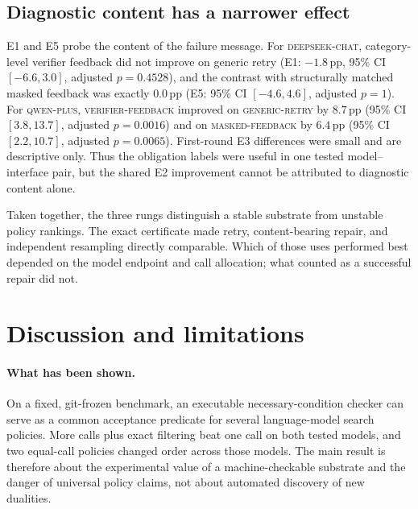 \documentclass[11pt]{scrartcl}
\newcommand{\dscode}{\textsc{deepseek-chat}}
\newcommand{\qwcode}{\textsc{qwen-plus}}
\newcommand{\grarm}{\textsc{generic-retry}}
\newcommand{\vfarm}{\textsc{verifier-feedback}}
\newcommand{\maskedarm}{\textsc{masked-feedback}}
\newcommand{\pp}{\,\mathrm{pp}}
\begin{document}
\subsection{Diagnostic content has a narrower effect}

E1 and E5 probe the content of the failure message.  For \dscode{},
category-level verifier feedback did not improve on generic retry (E1:
$-1.8\pp$, 95\% CI $[-6.6,3.0]$, adjusted $p=0.4528$), and the contrast with
structurally matched masked feedback was exactly $0.0\pp$ (E5: 95\% CI
$[-4.6,4.6]$, adjusted $p=1$).  For \qwcode{}, \vfarm{} improved on
\grarm{} by $8.7\pp$ (95\% CI $[3.8,13.7]$, adjusted $p=0.0016$) and on
\maskedarm{} by $6.4\pp$ (95\% CI $[2.2,10.7]$, adjusted $p=0.0065$).
First-round E3 differences were small and are descriptive only.  Thus the
obligation labels were useful in one tested model--interface pair, but the
shared E2 improvement cannot be attributed to diagnostic content alone.

\begin{table}[t]
\centering
\resizebox{\textwidth}{!}{}
\caption{Frozen GEE endpoints: standardized marginal risk differences in
percentage points with fixture-clustered robust 95\% confidence intervals.
E1, E2, and E4 across the two models share one paper-wide Holm family; E5 has a
separate two-model family.  $\dagger$ marks descriptive, unadjusted E3 tests.}
\label{tab:primary}
\end{table}

Taken together, the three rungs distinguish a stable substrate from unstable
policy rankings.  The exact certificate made retry, content-bearing repair, and
independent resampling directly comparable.  Which of those uses performed best
depended on the model endpoint and call allocation; what counted as a successful
repair did not.

\section{Discussion and limitations}
\label{sec:discussion}

\paragraph{What has been shown.}
On a fixed, git-frozen benchmark, an executable necessary-condition checker can
serve as a common acceptance predicate for several language-model search
policies.  More calls plus exact filtering beat one call on both tested models,
and two equal-call policies changed order across those models.  The main result
is therefore about the experimental value of a machine-checkable substrate and
the danger of universal policy claims, not about automated discovery of new
dualities.
\end{document}
